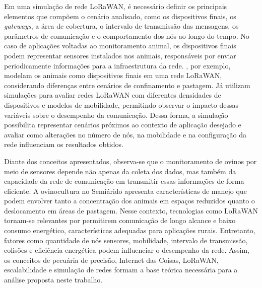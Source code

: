 Em uma simulação de rede LoRaWAN, é necessário definir os principais elementos que compõem o cenário analisado, como os dispositivos finais, os \textit{gateways}, a área de cobertura, o intervalo de transmissão das mensagens, os parâmetros de comunicação e o comportamento dos nós ao longo do tempo. No caso de aplicações voltadas ao monitoramento animal, os dispositivos finais podem representar sensores instalados nos animais, responsáveis por enviar periodicamente informações para a infraestrutura da rede. , por exemplo, modelam os animais como dispositivos finais em uma rede LoRaWAN, considerando diferenças entre cenários de confinamento e pastagem. Já  utilizam simulações para avaliar redes LoRaWAN com diferentes densidades de dispositivos e modelos de mobilidade, permitindo observar o impacto dessas variáveis sobre o desempenho da comunicação. Dessa forma, a simulação possibilita representar cenários próximos ao contexto de aplicação desejado e avaliar como alterações no número de nós, na mobilidade e na configuração da rede influenciam os resultados obtidos.

Diante dos conceitos apresentados, observa-se que o monitoramento de ovinos por meio de sensores depende não apenas da coleta dos dados, mas também da capacidade da rede de comunicação em transmitir essas informações de forma eficiente. A ovinocultura no Semiárido apresenta características de manejo que podem envolver tanto a concentração dos animais em espaços reduzidos quanto o deslocamento em áreas de pastagem. Nesse contexto, tecnologias como LoRaWAN tornam-se relevantes por permitirem comunicação de longo alcance e baixo consumo energético, características adequadas para aplicações rurais. Entretanto, fatores como quantidade de nós sensores, mobilidade, intervalo de transmissão, colisões e eficiência energética podem influenciar o desempenho da rede. Assim, os conceitos de pecuária de precisão, Internet das Coisas, LoRaWAN, escalabilidade e simulação de redes formam a base teórica necessária para a análise proposta neste trabalho.